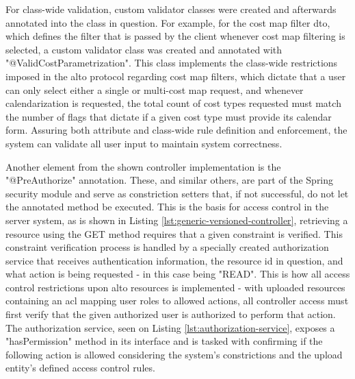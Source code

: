     For class-wide validation, custom validator classes were created and afterwards annotated into the class in question.
    For example, for the cost map filter \gls{dto}, which defines the filter that is passed by the client whenever cost map filtering is selected, a custom validator class was created and annotated with "@ValidCostParametrization".
    This class implements the class-wide restrictions imposed in the \gls{alto} protocol regarding cost map filters, which dictate that a user can only select either a single or multi-cost map request, and whenever calendarization is requested, the total count of cost types requested must match the number of flags that dictate if a given cost type must provide its calendar form.
    Assuring both attribute and class-wide rule definition and enforcement, the system can validate all user input to maintain system correctness.

    Another element from the shown controller implementation is the "@PreAuthorize" annotation.
    These, and similar others, are part of the Spring security module and serve as constriction setters that, if not successful, do not let the annotated method be executed.
    This is the basis for access control in the server system, as is shown in Listing \ref{lst:generic-versioned-controller}, retrieving a resource using the GET method requires that a given constraint is verified.
    This constraint verification process is handled by a specially created authorization service that receives authentication information, the resource id in question, and what action is being requested - in this case being "READ".
    This is how all access control restrictions upon \gls{alto} resources is implemented - with uploaded resources containing an \gls{acl} mapping user roles to allowed actions, all controller access must first verify that the given authorized user is authorized to perform that action.
    The authorization service, seen on Listing \ref{lst:authorization-service}, exposes a "hasPermission" method in its interface and is tasked with confirming if the following action is allowed considering the system's constrictions and the upload entity's defined access control rules.

